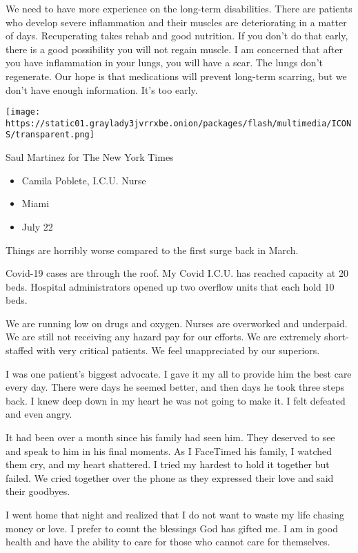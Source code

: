 We need to have more experience on the long-term disabilities. There are
patients who develop severe inflammation and their muscles are
deteriorating in a matter of days. Recuperating takes rehab and good
nutrition. If you don't do that early, there is a good possibility you
will not regain muscle. I am concerned that after you have inflammation
in your lungs, you will have a scar. The lungs don't regenerate. Our
hope is that medications will prevent long-term scarring, but we don't
have enough information. It's too early.

\texttt{[image: https://static01.graylady3jvrrxbe.onion/packages/flash/multimedia/ICONS/transparent.png]}

Saul Martinez for The New York Times

\begin{itemize}
\tightlist
\item
  Camila Poblete, I.C.U. Nurse
\item
  Miami
\item
  July 22
\end{itemize}

Things are horribly worse compared to the first surge back in March.

Covid-19 cases are through the roof. My Covid I.C.U. has reached
capacity at 20 beds. Hospital administrators opened up two overflow
units that each hold 10 beds.

We are running low on drugs and oxygen. Nurses are overworked and
underpaid. We are still not receiving any hazard pay for our efforts. We
are extremely short-staffed with very critical patients. We feel
unappreciated by our superiors.

I was one patient's biggest advocate. I gave it my all to provide him
the best care every day. There were days he seemed better, and then days
he took three steps back. I knew deep down in my heart he was not going
to make it. I felt defeated and even angry.

It had been over a month since his family had seen him. They deserved to
see and speak to him in his final moments. As I FaceTimed his family, I
watched them cry, and my heart shattered. I tried my hardest to hold it
together but failed. We cried together over the phone as they expressed
their love and said their goodbyes.

I went home that night and realized that I do not want to waste my life
chasing money or love. I prefer to count the blessings God has gifted
me. I am in good health and have the ability to care for those who
cannot care for themselves.


